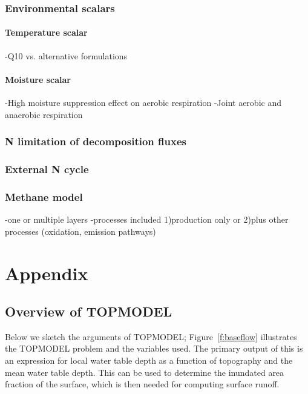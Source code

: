 \documentclass[twoside,10pt]{report}
\begin{document}
\subsection{Environmental scalars}

\subsubsection{Temperature scalar}

-Q10 vs. alternative formulations

\subsubsection{Moisture scalar}
-High moisture suppression effect on aerobic respiration
-Joint aerobic and anaerobic respiration

\subsection{N limitation of decomposition fluxes}
\subsection{External N cycle}
\subsection{Methane model}
-one or multiple layers
-processes included 1)production only or 2)plus other processes (oxidation, emission pathways)





\chapter{Appendix}
\section{Overview of TOPMODEL}\label{Appendix:TOPMODEL}

Below we sketch the arguments of TOPMODEL; Figure~\ref{f:baseflow} illustrates the TOPMODEL problem and the variables used. The primary output of this is an expression for local water table depth as a function of topography and the mean water table depth. This can be used to determine the inundated area fraction of the surface, which is then needed for computing surface runoff. 
\end{document}
